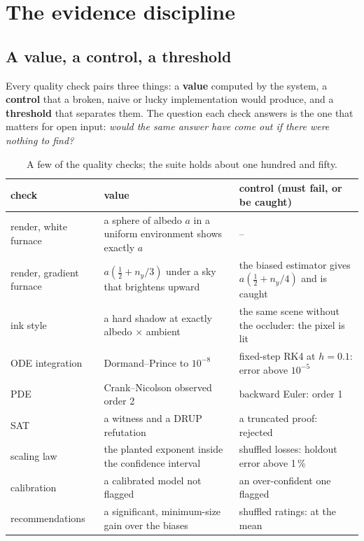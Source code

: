 \chapter{The evidence discipline}\label{ch:evidence}

\section{A value, a control, a threshold}

Every quality check pairs three things: a \textbf{value} computed by the system, a \textbf{control}
that a broken, naive or lucky implementation would produce, and a \textbf{threshold} that separates
them. The question each check answers is the one that matters for open input: \emph{would the same
answer have come out if there were nothing to find?}

\begin{table}[h]
\centering\small
\begin{tabularx}{\textwidth}{@{}lXX@{}}
\toprule
check & value & control (must fail, or be caught) \\
\midrule
render, white furnace & a sphere of albedo $a$ in a uniform environment shows exactly $a$ & -- \\
render, gradient furnace & $a(\tfrac12 + n_y/3)$ under a sky that brightens upward & the biased estimator gives $a(\tfrac12 + n_y/4)$ and is caught \\
ink style & a hard shadow at exactly albedo $\times$ ambient & the same scene without the occluder: the pixel is lit \\
ODE integration & Dormand--Prince to $10^{-8}$ & fixed-step RK4 at $h = 0.1$: error above $10^{-5}$ \\
PDE & Crank--Nicolson observed order 2 & backward Euler: order 1 \\
SAT & a witness and a DRUP refutation & a truncated proof: rejected \\
scaling law & the planted exponent inside the confidence interval & shuffled losses: holdout error above 1\,\% \\
calibration & a calibrated model not flagged & an over-confident one flagged \\
recommendations & a significant, minimum-size gain over the biases & shuffled ratings: at the mean \\
\bottomrule
\end{tabularx}
\caption{A few of the quality checks; the suite holds about one hundred and fifty.}
\end{table}


